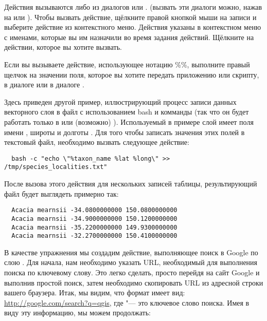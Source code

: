 Действия вызываются либо из диалогов  или
. (вызвать эти диалоги можно, нажав на
 или
). Чтобы вызвать
действие, щёлкните правой кнопкой мыши на записи и выберите действие из
контекстного меню. Действия указаны в контекстном меню с именами, которые
вы им назначили во время задания действий. Щёлкните на действии, которое
вы хотите вызвать.

Если вы вызываете действие, использующее нотацию \%\%, выполните правый
щелчок на значении поля, которое вы хотите передать приложению или скрипту,
в диалоге  или в диалоге .

Здесь приведен другой пример, иллюстрирующий процесс записи данных векторного
слоя в файл с использованием bash и комманды  (так что он
будет работать только в \nix или (возможно) \osx). Используемый в примере
слой имеет поля имени , широты  и долготы
. Для того чтобы записать значения этих полей в текстовый файл,
необходимо вызвать следующее действие:

\begin{verbatim}
  bash -c "echo \"%taxon_name %lat %long\" >> /tmp/species_localities.txt"
\end{verbatim}

После вызова этого действия для нескольких записей таблицы, результирующий
файл будет выглядеть примерно так:

\begin{verbatim}
  Acacia mearnsii -34.0800000000 150.0800000000
  Acacia mearnsii -34.9000000000 150.1200000000
  Acacia mearnsii -35.2200000000 149.9300000000
  Acacia mearnsii -32.2700000000 150.4100000000
\end{verbatim}

В качестве упражнения мы создадим действие, выполняющее поиск в Google по
слою . Для начала, нам необходимо указать URL, необходимый
для выполнения поиска по ключевому слову. Это легко сделать, просто перейдя
на сайт Google и выполнив простой поиск, затем необходимо скопировать URL
из адресной строки вашего браузера. Итак, мы видим, что формат имеет вид:
\url{http://google.com/search?q=qgis}, где \usertext{\qg} "--- это ключевое
слово поиска. Имея в виду эту информацию, мы можем продолжать:

